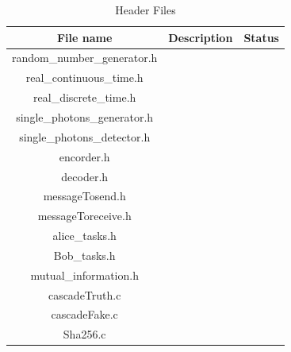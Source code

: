\begin{table}[hbt]
\centering
\caption{Header Files}
\label{tab:headerfiles}
\begin{tabular}{|c|c|c|}
\hline
\textbf{File name}           & \textbf{Description}  & \textbf{Status}       \\ \hline
random\_number\_generator.h  &                       &                       \\ \hline
real\_continuous\_time.h     &                       &                       \\ \hline
real\_discrete\_time.h       &                       &                       \\ \hline
single\_photons\_generator.h &                       &                       \\ \hline
single\_photons\_detector.h  &                       &                       \\ \hline
encorder.h                   &                       &                       \\ \hline
decoder.h                    &                       &                       \\ \hline
messageTosend.h              &                       &                       \\ \hline
messageToreceive.h           &                       &                       \\ \hline
alice\_tasks.h               &                       &                       \\ \hline
Bob\_tasks.h                 &                       &                       \\ \hline
mutual\_information.h        &                       &                       \\ \hline
cascadeTruth.c               &                       &                       \\ \hline
cascadeFake.c                &                       &                       \\ \hline
Sha256.c                     &                       &                       \\ \hline
\end{tabular}
\end{table}

